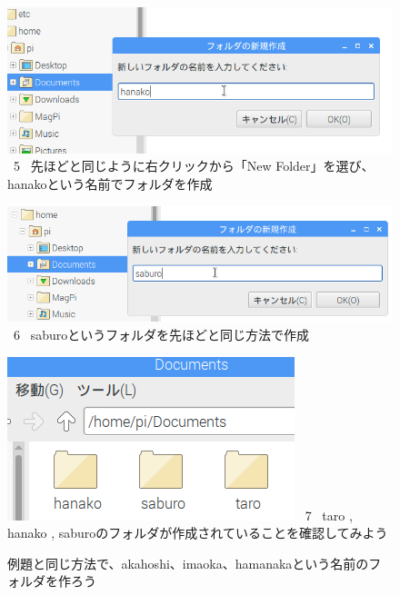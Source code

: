 \documentclass[a4paper,12pt]{jarticle}
\begin{document}
\begin{figure}
  \\
  \vspace{10mm}
  \centering
  \begin{minipage}{0.9\textwidth}
  \includegraphics[width=\linewidth]{textbook-img041.png}
    \ 5
    \ 先ほどと同じように右クリックから「New Folder」を選び、hanakoという名前でフォルダを作成
  \end{minipage}
  \vfill

  \centering
  \begin{minipage}{0.9\textwidth}
  \includegraphics[width=\linewidth]{textbook-img042.png}
    \ 6
    \ saburoというフォルダを先ほどと同じ方法で作成
  \end{minipage}
  \vfill

  \centering
  \begin{minipage}{0.9\textwidth}
  \includegraphics[width=\linewidth]{textbook-img043.png}
    \ 7 \ taro , hanako ,
    saburoのフォルダが作成されていることを確認してみよう
  \end{minipage}
  \vspace{10mm}
  \flushleft
  \theQuestion\label{Q:hasAnswer02-1}

  例題と同じ方法で、akahoshi、imaoka、hamanakaという名前のフォルダを作ろう

\end{figure}
\clearpage
{}
\end{document}
